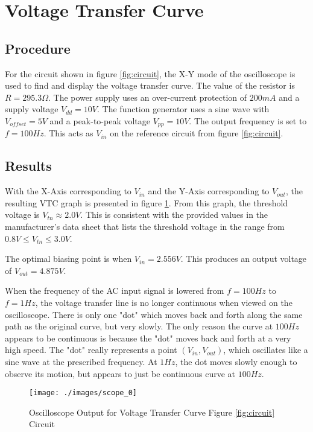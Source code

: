 
\section{Voltage Transfer Curve}

\subsection{Procedure}

For the circuit shown in figure \ref{fig:circuit}, the X-Y mode of the oscilloscope is used to find and display the voltage transfer curve. The value of the resistor is $R=295.3 \Omega$. The power supply uses an over-current protection of $200mA$ and a supply voltage $V_{dd} = 10V$. The function generator uses a sine wave with $V_{offset} = 5V$ and a peak-to-peak voltage $V_{pp} = 10V$. The output frequency is set to $f = 100 Hz$. This acts as $V_{in}$ on the reference circuit from figure \ref{fig:circuit}.

\FloatBarrier

\subsection{Results}
With the X-Axis corresponding to $V_{in}$ and the Y-Axis corresponding to $V_{out}$, the resulting VTC graph is presented in figure \ref{fig:vtc_result}. From this graph, the threshold voltage is $V_{tn}\approx 2.0V$. This is consistent with the provided values in the manufacturer's data sheet that lists the threshold voltage in the range from $0.8 V \le V_{tn} \le 3.0 V$.

The optimal biasing point is when $V_{in} = 2.556 V$. This produces an output voltage of $V_{out} = 4.875 V$.

When the frequency of the AC input signal is lowered from $f=100Hz$ to $f=1 Hz$, the voltage transfer line is no longer continuous when viewed on the oscilloscope. There is only one "dot" which moves back and forth along the same path as the original curve, but very slowly. The only reason the curve at $100 Hz$ appears to be continuous is because the "dot" moves back and forth at a very high speed. The "dot" really represents a point $(V_{in},V_{out})$, which oscillates like a sine wave at the prescribed frequency. At $1 Hz$, the dot moves slowly enough to observe its motion, but appears to just be continuous curve at $100 Hz$.

\FloatBarrier
\begin{figure}[h!]
	\centering
	\texttt{[image: ./images/scope\_0]}
	\caption{Oscilloscope Output for Voltage Transfer Curve Figure \ref{fig:circuit} Circuit}
	\label{fig:vtc_result}
\end{figure}
\FloatBarrier
